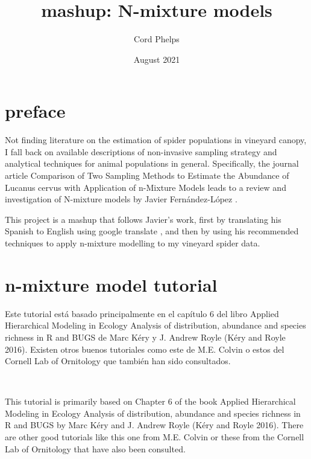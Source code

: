 \documentclass[
]{book}
\title{mashup: N-mixture models}
\author{Cord Phelps}
\date{August 2021}
\begin{document}
\maketitle

{
\setcounter{tocdepth}{1}
\tableofcontents
}
\hypertarget{preface}{%
\chapter{preface}\label{preface}}

Not finding literature on the estimation of spider populations in vineyard canopy, I fall back on available descriptions of non-invasive sampling strategy and analytical techniques for animal populations in general. Specifically, the journal article Comparison of Two Sampling Methods to Estimate the Abundance of Lucanus cervus with Application of n-Mixture Models \citep{f11101085} leads to a review and investigation of N-mixture models by Javier Fernández-López \citep{fernandez-lopez_n-mixture_2020}.

This project is a mashup that follows Javier's work, first by translating his Spanish to English using google translate \citep{noauthor_google_nodate}, and then by using his recommended techniques to apply n-mixture modelling to my vineyard spider data.

\hypertarget{n-mixture-model-tutorial}{%
\chapter{n-mixture model tutorial}\label{n-mixture-model-tutorial}}

\begin{col}{0.45\textwidth}
Este tutorial está basado principalmente en el capítulo 6 del libro Applied Hierarchical Modeling in Ecology Analysis of distribution, abundance and species richness in R and BUGS de Marc Kéry y J. Andrew Royle (Kéry and Royle 2016). Existen otros buenos tutoriales como este de M.E. Colvin o estos del Cornell Lab of Ornitology que también han sido consultados.

\end{col}

\begin{col}{0.05\textwidth}
~

\end{col}

\begin{col}{0.45\textwidth}
This tutorial is primarily based on Chapter 6 of the book Applied Hierarchical Modeling in Ecology Analysis of distribution, abundance and species richness in R and BUGS by Marc Kéry and J. Andrew Royle (Kéry and Royle 2016). There are other good tutorials like this one from M.E. Colvin or these from the Cornell Lab of Ornitology that have also been consulted.

\end{col}
\end{document}
